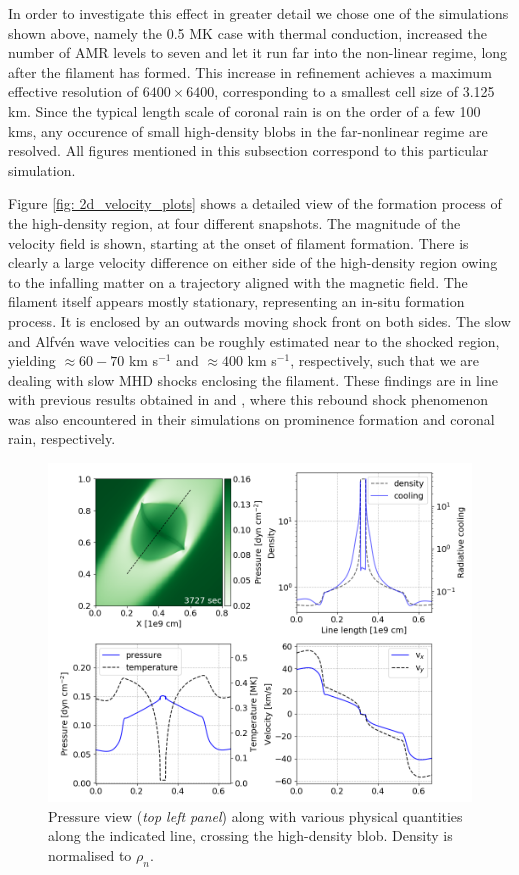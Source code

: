 In order to investigate this effect in greater detail we chose one of the simulations shown above, namely the 0.5 MK case with thermal conduction, increased the number of AMR levels to seven and let it run far into the non-linear regime, long after the filament has formed. This increase in refinement achieves a maximum effective resolution of $6400 \times 6400$, corresponding to a smallest cell size of 3.125 km. Since the typical length scale of coronal rain is on the order of a few 100 kms, any occurence of small high-density blobs in the far-nonlinear regime are resolved. All figures mentioned in this subsection correspond to this particular simulation.



Figure \ref{fig: 2d_velocity_plots} shows a detailed view of the formation process of the high-density region, at four different snapshots. The magnitude of the velocity field is shown, starting at the onset of filament formation. There is clearly a large velocity difference on either side of the high-density region owing to the infalling matter on a trajectory aligned with the magnetic field. The filament itself appears mostly stationary, representing an in-situ formation process. It is enclosed by an outwards moving shock front on both sides. The slow and Alfv\'en wave velocities can be roughly estimated near to the shocked region, yielding $\approx 60-70$ km s$^{-1}$ and $\approx 400$ km s$^{-1}$, respectively, such that we are dealing with slow MHD shocks enclosing the filament. These findings are in line with previous results obtained in \citet{xia2012} and \citet{fang2015}, where this rebound shock phenomenon was also encountered in their simulations on prominence formation and coronal rain, respectively.

\begin{figure}[b]
  \centering
  \includegraphics[width=\textwidth]{2d_lineplots.png}
  \caption{
    Pressure view (\emph{top left panel}) along with various physical quantities along the indicated line, crossing the high-density blob. Density is normalised to $\rho_n$.
  }
  \label{fig: 2d_lineplots}
\end{figure}

